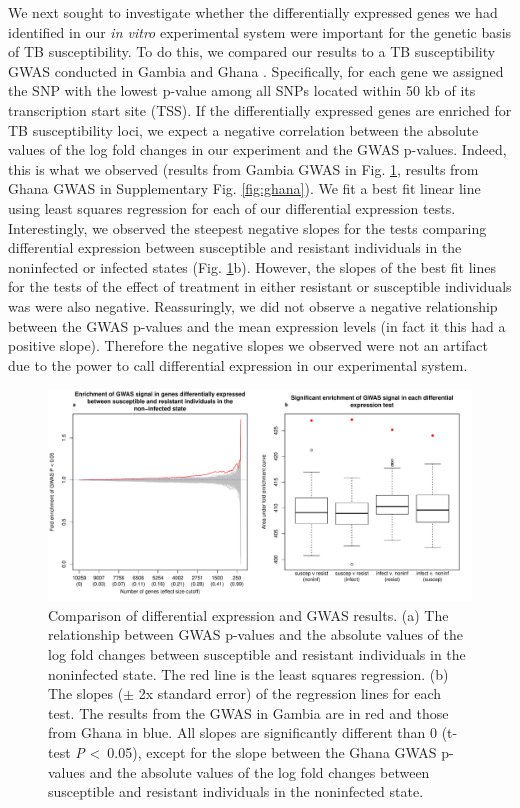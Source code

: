\documentclass[fleqn,10pt]{wlscirep}
\begin{document}
We next sought to investigate whether the differentially expressed genes we had identified in our \emph{in vitro} experimental system were important for the genetic basis of TB susceptibility. To do this, we compared our results to a TB susceptibility GWAS conducted in Gambia and Ghana \cite{Thye2010}. Specifically, for each gene we assigned the SNP with the lowest p-value among all SNPs located within 50 kb of its transcription start site (TSS). If the differentially expressed genes are enriched for TB susceptibility loci, we expect a negative correlation between the absolute values of the log fold changes in our experiment and the GWAS p-values. Indeed, this is what we observed (results from Gambia GWAS in Fig. \ref{fig:gwas}, results from Ghana GWAS in Supplementary Fig. \ref{fig:ghana}). We fit a best fit linear line using least squares regression for each of our differential expression tests. Interestingly, we observed the steepest negative slopes for the tests comparing differential expression between susceptible and resistant individuals in the noninfected or infected states (Fig. \ref{fig:gwas}b). However, the slopes of the best fit lines for the tests of the effect of treatment in either resistant or susceptible individuals was were also negative. Reassuringly, we did not observe a negative relationship between the GWAS p-values and the mean expression levels (in fact it this had a positive slope). Therefore the negative slopes we observed were not an artifact due to the power to call differential expression in our experimental system.

\begin{figure}[ht]
\centering
\includegraphics[width=\linewidth]{../figure/gwas.pdf}
\caption{
Comparison of differential expression and GWAS results. (a) The relationship between GWAS p-values \cite{Thye2010} and the absolute values of the log fold changes between susceptible and resistant individuals in the noninfected state. The red line is the least squares regression. (b) The slopes ($\pm$ 2x standard error) of the regression lines for each test. The results from the GWAS in Gambia are in red and those from Ghana in blue. All slopes are significantly different than 0 (t-test \emph{P} \textless \, 0.05), except for the slope between the Ghana GWAS p-values and the absolute values of the log fold changes between susceptible and resistant individuals in the noninfected state.
}
\label{fig:gwas}
\end{figure}
\end{document}
